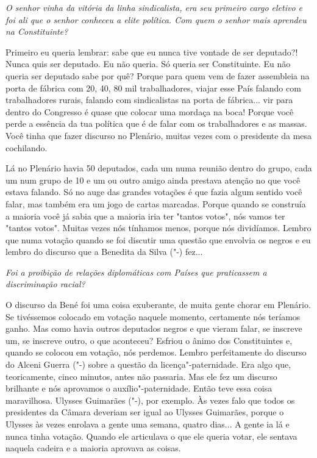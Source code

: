 \medskip

\noindent\emph{O senhor vinha da vitória da linha sindicalista, era seu
primeiro cargo eletivo e foi ali que o senhor conheceu a elite política.
Com quem o senhor mais aprendeu na Constituinte?}

Primeiro eu queria lembrar: sabe que eu nunca tive
vontade de ser deputado?! Nunca quis ser deputado. Eu não queria. Só
queria ser Constituinte. Eu não queria ser deputado sabe por quê? Porque
para quem vem de fazer assembleia na porta de fábrica com 20, 40, 80 mil
trabalhadores, viajar esse País falando com trabalhadores rurais,
falando com sindicalistas na porta de fábrica... vir para dentro do
Congresso é quase que colocar uma mordaça na boca! Porque você perde a
essência da tua política que é de falar com os trabalhadores e as
massas. Você tinha que fazer discurso no Plenário, muitas vezes com o
presidente da mesa cochilando.

Lá no Plenário havia 50 deputados, cada um numa reunião dentro do grupo,
cada um num grupo de 10 e um ou outro amigo ainda prestava atenção no
que você estava falando. Só no auge das grandes votações é que fazia
algum sentido você falar, mas também era um jogo de cartas marcadas.
Porque quando se construía a maioria você já sabia que a maioria iria
ter "tantos votos", nós vamos ter "tantos votos". Muitas vezes nós
tínhamos menos, porque nós dividíamos. Lembro que numa votação quando se
foi discutir uma questão que envolvia os negros e eu lembro do discurso
que a Benedita da Silva ("-) fez...

\medskip

\noindent\emph{Foi a proibição de relações diplomáticas com Países que
praticassem a discriminação racial?}

O discurso da Bené foi uma coisa exuberante, de muita
gente chorar em Plenário. Se tivéssemos colocado em votação naquele
momento, certamente nós teríamos ganho. Mas como havia outros deputados
negros e que vieram falar, se inscreve um, se inscreve outro, o que
aconteceu? Esfriou o ânimo dos Constituintes e, quando se colocou em
votação, nós perdemos. Lembro perfeitamente do discurso do Alceni Guerra
("-) sobre a questão da licença"-paternidade. Era algo que,
teoricamente, cinco minutos, antes não passaria. Mas ele fez um discurso
brilhante e nós aprovamos o auxílio"-paternidade. Então teve essa coisa
maravilhosa. Ulysses Guimarães ("-), por exemplo. Às vezes falo que
todos os presidentes da Câmara deveriam ser igual ao Ulysses Guimarães,
porque o Ulysses às vezes enrolava a gente uma semana, quatro dias... A
gente ia lá e nunca tinha votação. Quando ele articulava o que ele
queria votar, ele sentava naquela cadeira e a maioria aprovava as
coisas.

